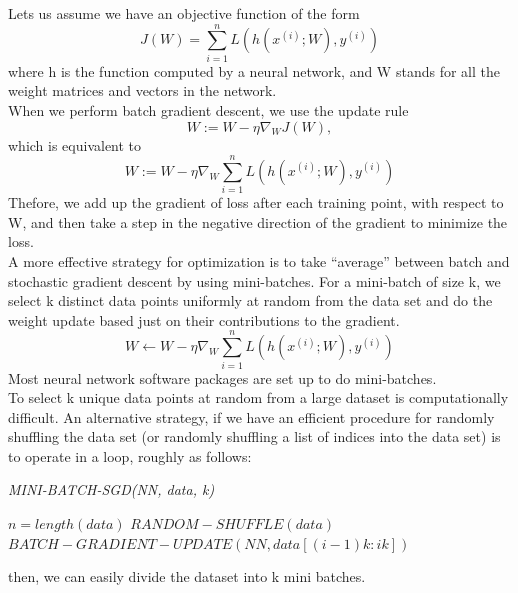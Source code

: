 Lets us assume we have an objective function of the form\\
\begin{equation*}
    J(W) = \sum_{i=1} ^n L(h(x^{(i)};W),y^{(i)})
\end{equation*}
where h is the function computed by a neural network, and W stands for all the weight
matrices and vectors in the network.\\
When we perform batch gradient descent, we use the update rule \\
\begin{equation*}
    W := W-\eta \nabla_W J(W), 
\end{equation*}
which is equivalent to 
\begin{equation*}
     W := W-\eta \nabla_W \sum_{i=1} ^n L(h(x^{(i)};W),y^{(i)})
\end{equation*}
Thefore, we add up the gradient of loss after each training point, with respect to W, and then take a step in the negative direction of the gradient to minimize the loss.\\


A more effective strategy for optimization is to take “average” between batch and stochastic gradient descent by using mini-batches. For a mini-batch of size k, we select k distinct data points uniformly at random from the data set and do the weight update based just on their contributions to the gradient.
\begin{equation*}
    W \leftarrow W-\eta \nabla_W \sum_{i=1} ^n L(h(x^{(i)};W),y^{(i)})
\end{equation*}
Most neural network software packages are set up to do mini-batches\cite{25}.\\

To select k unique data points at random from a large dataset is computationally difficult. An alternative strategy, if we have an efficient procedure for randomly shuffling the data set (or randomly shuffling a list of indices into the data set) is to operate
in a loop, roughly as follows:\\
\begin{algorithm}
\caption{\textit{MINI-BATCH-SGD(NN, data, k)}}\label{alg:cap}
\begin{algorithmic}
\State $n = length(data)$
     \State $RANDOM-SHUFFLE(data)$
           \State $BATCH-GRADIENT-UPDATE(NN,data[(i-1)k:ik])$
\end{algorithmic}
\end{algorithm}
then, we can easily divide the dataset into k mini batches.

